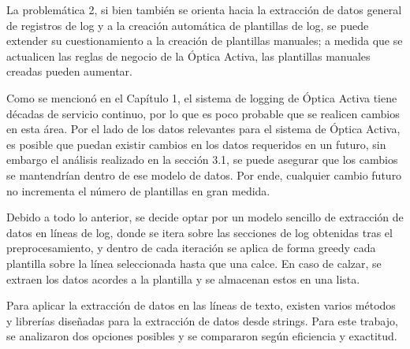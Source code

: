 La problemática 2, si bien también se orienta hacia la extracción de datos general de registros de log y a la creación automática de plantillas de log, se puede extender su cuestionamiento a la creación de plantillas manuales; a medida que se actualicen las reglas de negocio de la Óptica Activa, las plantillas manuales creadas pueden aumentar.

Como se mencionó en el Capítulo 1, el sistema de logging de Óptica Activa tiene décadas de servicio continuo, por lo que es poco probable que se realicen cambios en esta área. Por el lado de los datos relevantes para el sistema de Óptica Activa, es posible que puedan existir cambios en los datos requeridos en un futuro, sin embargo el análisis realizado en la sección 3.1, se puede asegurar que los cambios se mantendrían dentro de ese modelo de datos. Por ende, cualquier cambio futuro no incrementa el número de plantillas en gran medida.

Debido a todo lo anterior, se decide optar por un modelo sencillo de extracción de datos en líneas de log, donde se itera sobre las secciones de log obtenidas tras el preprocesamiento, y dentro de cada iteración se aplica de forma greedy cada plantilla sobre la línea seleccionada hasta que una calce. En caso de calzar, se extraen los datos acordes a la plantilla y se almacenan estos en una lista.

Para aplicar la extracción de datos en las líneas de texto, existen varios métodos y librerías diseñadas para la extracción de datos desde strings. Para este trabajo, se analizaron dos opciones posibles y se compararon según eficiencia y exactitud.

